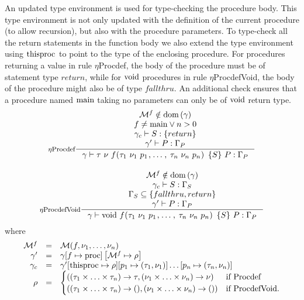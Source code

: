 \documentclass[a4paper, 10pt, draft]{report}
\newcommand{\mycode}[1]{\ensuremath{\mbox{\lstinline{#1}}}}
\begin{document}
An updated type environment is used for type-checking the procedure body. This
type environment is not only updated with the definition of the current
procedure (to allow recursion), but also with the procedure parameters. To
type-check all the return statements in the function body we also extend the
type environment using \mycode{thisproc} to point to the type of the enclosing
procedure. For procedures returning a value in rule $\eta$Procdef, the body of
the procedure must be of statement type $return$, while for \mycode{void}
procedures in rule $\eta$ProcdefVoid, the body of the procedure might also be
of type $fallthru$. An additional check ensures that a procedure named
\mycode{main} taking no parameters can only be of \mycode{void} return type.
\[\begin{array}{c}
\inference[$\eta$Procdef]{
  \mathcal{M}^f \notin \operatorname{dom}\left( \gamma \right) \\
    f \neq \mycode{main} \lor n > 0 \\
    \gamma_c |- S : \left\{ return \right\} \\
    \gamma' |- P : \Gamma_P
}{
  \gamma |- \tau\ \nu\ f\mycode{(} \tau_1\ \nu_1\ p_1 \mycode{,} \ldots \mycode{,}\ \tau_n\ \nu_n\ p_n\mycode{) \{}S\mycode{\}}\ P : \Gamma_P
} \\[2em]
\inference[$\eta$ProcdefVoid]{
  \mathcal{M}^f \notin \operatorname{dom}\left( \gamma \right) \\
    \gamma_c |- S : \Gamma_S \\
    \Gamma_S \subseteq \left\{ fallthru, return \right\} \\
    \gamma' |- P : \Gamma_P
}{
  \gamma |- \mycode{void}\ f\mycode{(} \tau_1\ \nu_1\ p_1 \mycode{,} \ldots \mycode{,}\ \tau_n\ \nu_n\ p_n\mycode{) \{}S\mycode{\}}\ P : \Gamma_P
}
\end{array} \]
where \[\begin{array}{rcl}
  \mathcal{M}^f & = & \mathcal{M}(f,\nu_1,\ldots,\nu_n) \\
    \gamma'     & = & \gamma[f \mapsto \mycode{proc}]\left[ \mathcal{M}^f \mapsto \rho \right] \\
    \gamma_c    & = & \gamma'[\mycode{thisproc} \mapsto \rho]
                             [p_1 \mapsto (\tau_1, \nu_1)]\dots[p_n \mapsto (\tau_n, \nu_n)] \\
    \rho        & = & \begin{cases} 
      ( (\tau_1\times\ldots\times\tau_n)\to\tau, (\nu_1\times\ldots\times\nu_n)\to\nu) & \text{if Procdef} \\
      ( (\tau_1\times\ldots\times\tau_n)\to(), (\nu_1\times\ldots\times\nu_n)\to()) & \text{if ProcdefVoid}. \\
    \end{cases}
\end{array}\]
\vspace{0.5cm}
\end{document}
